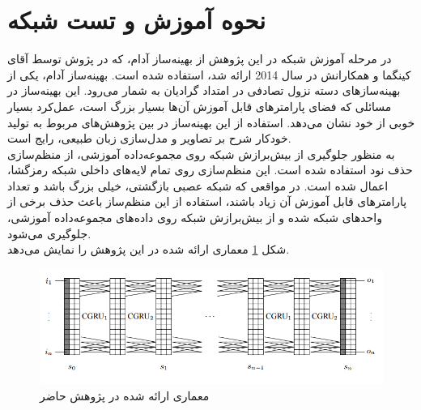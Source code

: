 \section{نحوه آموزش و تست شبکه}
در مرحله آموزش شبکه در این پژوهش از بهینه‌ساز آدام، که در پژوش \cite{kingma2014adam} توسط آقای کینگما و همکارانش در سال 2014 ارائه شد، استفاده شده است. بهینه‌ساز آدام، یکی از بهینه‌سازهای دسته نزول تصادفی در امتداد گرادیان
 به شمار می‌رود. این بهینه‌ساز در مسائلی که فضای پارامترهای قابل آموزش آن‌ها بسیار بزرگ است، عمل‌کرد بسیار خوبی از خود نشان می‌دهد. استفاده از این بهینه‌ساز در بین پژوهش‌های مربوط به تولید خودکار شرح بر تصاویر و مدل‌سازی زبان طبیعی، رایج است.
\\
به منظور جلوگیری از بیش‌برازش شبکه روی مجموعه‌داده آموزشی، از منظم‌سازی حذف نود استفاده شده است. این منظم‌سازی روی تمام لایه‌های داخلی شبکه رمزگشا، اعمال شده است. در مواقعی که شبکه عصبی بازگشتی، خیلی بزرگ باشد و تعداد پارامترهای قابل آموزش آن زیاد باشند، استفاده از این منظم‌ساز باعث حذف برخی از واحدهای شبکه شده و از بیش‌برازش شبکه روی داده‌های مجموعه‌داده آموزشی، جلوگیری می‌شود. 
\\
شکل \ref{fig:arch} معماری ارائه شده در این پژوهش را نمایش می‌دهد.
\begin{figure}[h]
	\centering
	\includegraphics[scale=0.5]{Imgs/NeuralGPU.png}
	\caption{معماری ارائه شده در پژوهش حاضر}
	\label{fig:arch}
\end{figure}


